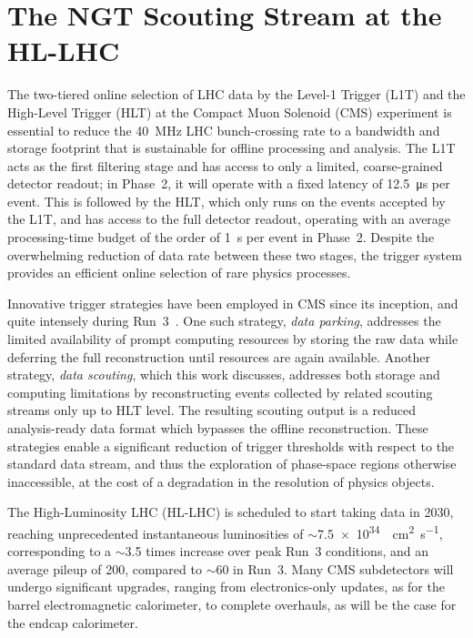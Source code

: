 \documentclass{webofc}
\newcommand{\sm}{\ensuremath{\sim}}
\begin{document}
\section{The NGT Scouting Stream at the HL-LHC}
\label{intro}
The two-tiered online selection of LHC data by the Level-1 Trigger (L1T) and the High-Level Trigger (HLT) at the Compact Muon Solenoid (CMS) experiment \cite{cms} is essential to reduce the \SI{40}{\mega\hertz} LHC bunch-crossing rate to a bandwidth and storage footprint that is sustainable for offline processing and analysis.
The L1T acts as the first filtering stage and has access to only a limited, coarse-grained detector readout; in Phase~2, it will operate with a fixed latency of \SI{12.5}{\micro\second} per event.
This is followed by the HLT, which only runs on the events accepted by the L1T, and has access to the full detector readout, operating with an average processing-time budget of the order of \SI{1}{\second} per event in Phase~2.
Despite the overwhelming reduction of data rate between these two stages, the trigger system provides an efficient online selection of rare physics processes. \par
%
Innovative trigger strategies have been employed in CMS since its inception, and quite intensely during Run~3~\cite{scout}.
One such strategy, \textit{data parking}, addresses the limited availability of prompt computing resources by storing the raw data while deferring the full reconstruction until resources are again available.
Another strategy, \textit{data scouting}, which this work discusses, addresses both storage and computing limitations by reconstructing events collected by related scouting streams only up to HLT level.
The resulting scouting output is a reduced analysis-ready data format which bypasses the offline reconstruction.
These strategies enable a significant reduction of trigger thresholds with respect to the standard data stream, and thus the exploration of phase-space regions otherwise inaccessible, at the cost of a degradation in the resolution of physics objects. \par
%
The High-Luminosity LHC (HL-LHC) is scheduled to start taking data in 2030, reaching unprecedented instantaneous luminosities of \sm\SI{7.5e34}{\per\square\centi\meter\per\second}, corresponding to a \sm3.5 times increase over peak Run~3 conditions, and an average pileup of 200, compared to \sm60 in Run~3.
Many CMS subdetectors will undergo significant upgrades, ranging from electronics-only updates, as for the barrel electromagnetic calorimeter, to complete overhauls, as will be the case for the endcap calorimeter.
\end{document}
